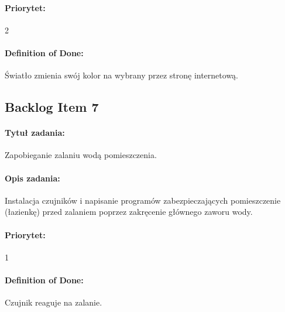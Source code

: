	\paragraph{Priorytet:}
	2
	
	\paragraph{Definition of Done:}
	Światło zmienia swój kolor na wybrany przez stronę internetową.


	
	\subsection{Backlog Item 7}
	\paragraph{Tytuł zadania:}
	Zapobieganie zalaniu wodą pomieszczenia.
	
	\paragraph{Opis zadania:} 
	Instalacja czujników i napisanie programów zabezpieczających pomieszczenie (łazienkę) przed zalaniem poprzez zakręcenie głównego zaworu wody. 
	
	\paragraph{Priorytet:} 
	1
	
	\paragraph{Definition of Done:}
	Czujnik reaguje na zalanie.


	
